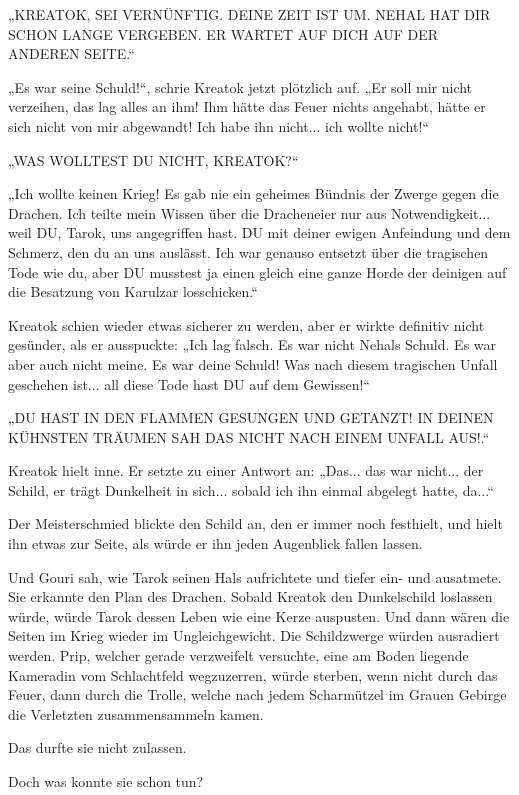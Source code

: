 „KREATOK, SEI VERNÜNFTIG. DEINE ZEIT IST UM. NEHAL HAT DIR SCHON LANGE VERGEBEN. ER WARTET AUF DICH AUF DER ANDEREN SEITE.“

„Es war seine Schuld!“, schrie Kreatok jetzt plötzlich auf. „Er soll mir nicht verzeihen, das lag alles an ihm! Ihm hätte das Feuer nichts angehabt, hätte er sich nicht von mir abgewandt! Ich habe ihn nicht... ich wollte nicht!“

„WAS WOLLTEST DU NICHT, KREATOK?“

„Ich wollte keinen Krieg! Es gab nie ein geheimes Bündnis der Zwerge gegen die Drachen. Ich teilte mein Wissen über die Dracheneier nur aus Notwendigkeit... weil DU, Tarok, uns angegriffen hast. DU mit deiner ewigen Anfeindung und dem Schmerz, den du an uns auslässt. Ich war genauso entsetzt über die tragischen Tode wie du, aber DU musstest ja einen gleich eine ganze Horde der deinigen auf die Besatzung von Karulzar losschicken.“

Kreatok schien wieder etwas sicherer zu werden, aber er wirkte definitiv nicht gesünder, als er ausspuckte: „Ich lag falsch. Es war nicht Nehals Schuld. Es war aber auch nicht meine. Es war deine Schuld! Was nach diesem tragischen Unfall geschehen ist... all diese Tode hast DU auf dem Gewissen!“

„DU HAST IN DEN FLAMMEN GESUNGEN UND GETANZT! IN DEINEN KÜHNSTEN TRÄUMEN SAH DAS NICHT NACH EINEM UNFALL AUS!.“

Kreatok hielt inne. Er setzte zu einer Antwort an: „Das... das war nicht... der Schild, er trägt Dunkelheit in sich... sobald ich ihn einmal abgelegt hatte, da...“

Der Meisterschmied blickte den Schild an, den er immer noch festhielt, und hielt ihn etwas zur Seite, als würde er ihn jeden Augenblick fallen lassen.

Und Gouri sah, wie Tarok seinen Hals aufrichtete und tiefer ein- und ausatmete. Sie erkannte den Plan des Drachen. Sobald Kreatok den Dunkelschild loslassen würde, würde Tarok dessen Leben wie eine Kerze auspusten. Und dann wären die Seiten im Krieg wieder im Ungleichgewicht. Die Schildzwerge würden ausradiert werden. Prip, welcher gerade verzweifelt versuchte, eine am Boden liegende Kameradin vom Schlachtfeld wegzuzerren, würde sterben, wenn nicht durch das Feuer, dann durch die Trolle, welche nach jedem Scharmützel im Grauen Gebirge die Verletzten zusammensammeln kamen.

Das durfte sie nicht zulassen.

Doch was konnte sie schon tun?

